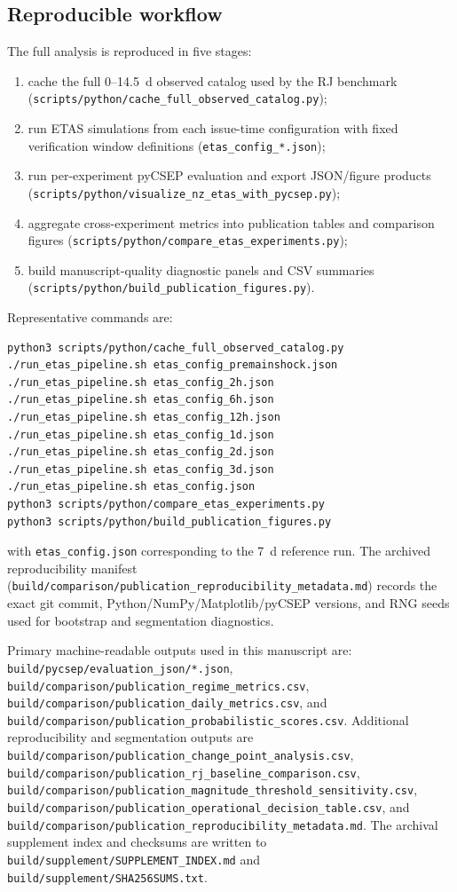 \documentclass[12pt,letterpaper]{article}
\begin{document}
\subsection{Reproducible workflow}

The full analysis is reproduced in five stages:
\begin{enumerate}
    \item cache the full 0--14.5~d observed catalog used by the RJ benchmark
          (\texttt{scripts/python/cache\_full\_observed\_catalog.py});
    \item run ETAS simulations from each issue-time configuration with fixed
          verification window definitions (\texttt{etas\_config\_*.json});
    \item run per-experiment pyCSEP evaluation and export JSON/figure products
          (\texttt{scripts/python/visualize\_nz\_etas\_with\_pycsep.py});
    \item aggregate cross-experiment metrics into publication tables and
          comparison figures
          (\texttt{scripts/python/compare\_etas\_experiments.py});
    \item build manuscript-quality diagnostic panels and CSV summaries
          (\texttt{scripts/python/build\_publication\_figures.py}).
\end{enumerate}

Representative commands are:
\begin{verbatim}
python3 scripts/python/cache_full_observed_catalog.py
./run_etas_pipeline.sh etas_config_premainshock.json
./run_etas_pipeline.sh etas_config_2h.json
./run_etas_pipeline.sh etas_config_6h.json
./run_etas_pipeline.sh etas_config_12h.json
./run_etas_pipeline.sh etas_config_1d.json
./run_etas_pipeline.sh etas_config_2d.json
./run_etas_pipeline.sh etas_config_3d.json
./run_etas_pipeline.sh etas_config.json
python3 scripts/python/compare_etas_experiments.py
python3 scripts/python/build_publication_figures.py
\end{verbatim}
with \texttt{etas\_config.json} corresponding to the 7~d reference run.
The archived reproducibility manifest
(\texttt{build/comparison/publication\_reproducibility\_metadata.md}) records
the exact git commit, Python/NumPy/Matplotlib/pyCSEP versions, and RNG seeds
used for bootstrap and segmentation diagnostics.

Primary machine-readable outputs used in this manuscript are:
\texttt{build/pycsep/evaluation\_json/*.json},
\texttt{build/comparison/publication\_regime\_metrics.csv},
\texttt{build/comparison/publication\_daily\_metrics.csv}, and
\texttt{build/comparison/publication\_probabilistic\_scores.csv}.
Additional reproducibility and segmentation outputs are
\texttt{build/comparison/publication\_change\_point\_analysis.csv},
\texttt{build/comparison/publication\_rj\_baseline\_comparison.csv},
\texttt{build/comparison/publication\_magnitude\_threshold\_sensitivity.csv},
\texttt{build/comparison/publication\_operational\_decision\_table.csv}, and
\texttt{build/comparison/publication\_reproducibility\_metadata.md}.
The archival supplement index and checksums are written to
\texttt{build/supplement/SUPPLEMENT\_INDEX.md} and
\texttt{build/supplement/SHA256SUMS.txt}.
\end{document}
